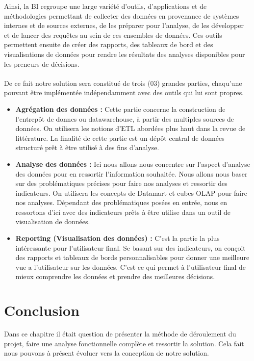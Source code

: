 Ainsi, la BI regroupe une large variété d’outils, d’applications et de méthodologies permettant de collecter des données en provenance de systèmes internes et de sources externes, de les préparer pour l’analyse, de les développer et de lancer des requêtes au sein de ces ensembles de données. Ces outils permettent ensuite de créer des rapports, des tableaux de bord et des visualisations de données pour rendre les résultats des analyses disponibles pour les preneurs de décisions.
\paragraph{}

De ce fait notre solution sera constitué de trois (03) grandes parties, chaqu’une pouvant être implémentée indépendamment avec des outils qui lui sont propres.  
\begin{itemize}
    \item \textbf{Agrégation des données :} Cette partie concerne la construction de l’entrepôt de donnes ou datawarehouse, à partir des multiples sources de données. On utilisera les notions d’ETL abordées plus haut dans la revue de littérature. La finalité de cette partie est un dépôt central de données structuré prêt à être utilisé à des fins d’analyse.
    \item \textbf{Analyse des données :}  Ici nous allons nous concentre sur l’aspect d’analyse des données pour en ressortir l’information souhaitée. Nous allons nous baser sur des problématiques précises pour faire nos analyses et ressortir des indicateurs. On utilisera les concepts de Datamart et cubes OLAP pour faire nos analyses. Dépendant des problématiques posées en entrée, nous en ressortons d’ici avec des indicateurs prêts à être utilise dans un outil de visualisation de données.
    \item \textbf{Reporting (Visualisation des données) :} C’est la partie la plus intéressante pour l’utilisateur final. Se basant sur des indicateurs, on conçoit des rapports et tableaux de bords personnalisables pour donner une meilleure vue a l’utilisateur sur les données. C’est ce qui permet à l’utilisateur final de mieux comprendre les données et prendre des meilleures décisions.
\end{itemize}

\section*{Conclusion}%
%
Dans ce chapitre il était question de présenter la méthode de déroulement du projet, faire une analyse fonctionnelle complète et ressortir la solution. Cela fait nous pouvons à présent évoluer vers la conception de notre solution.  
